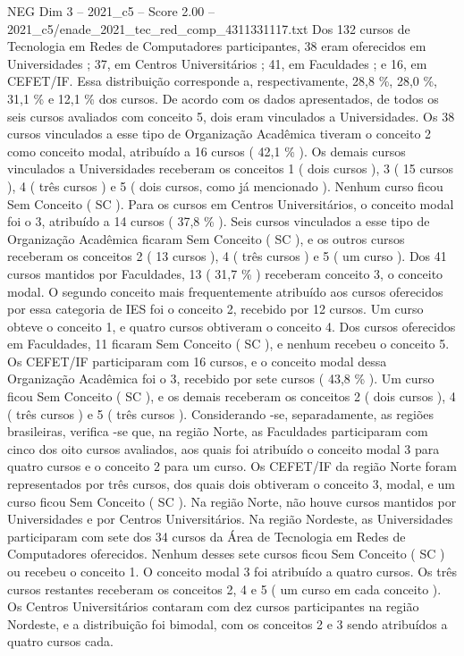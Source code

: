 \begin{textsample}{NEG Dim 3 – 2021\_c5 – Score 2.00 – 2021\_c5/enade\_2021\_tec\_red\_comp\_4311331117.txt}
Dos 132 cursos de Tecnologia em Redes de Computadores participantes, 38 eram oferecidos em Universidades ; 37, em Centros Universitários ; 41, em Faculdades ; e 16, em CEFET/IF.
Essa distribuição corresponde a, respectivamente, 28,8 \%, 28,0 \%, 31,1 \% e 12,1 \% dos cursos.
De acordo com os dados apresentados, de todos os seis cursos avaliados com conceito 5, dois eram vinculados a Universidades.
Os 38 cursos vinculados a esse tipo de Organização Acadêmica tiveram o conceito 2 como conceito modal, atribuído a 16 cursos ( 42,1 \% ).
Os demais cursos vinculados a Universidades receberam os conceitos 1 ( dois cursos ), 3 ( 15 cursos ), 4 ( três cursos ) e 5 ( dois cursos, como já mencionado ).
Nenhum curso ficou Sem Conceito ( SC ).
Para os cursos em Centros Universitários, o conceito modal foi o 3, atribuído a 14 cursos ( 37,8 \% ).
Seis cursos vinculados a esse tipo de Organização Acadêmica ficaram Sem Conceito ( SC ), e os outros cursos receberam os conceitos 2 ( 13 cursos ), 4 ( três cursos ) e 5 ( um curso ).
Dos 41 cursos mantidos por Faculdades, 13 ( 31,7 \% ) receberam conceito 3, o conceito modal.
O segundo conceito mais frequentemente atribuído aos cursos oferecidos por essa categoria de IES foi o conceito 2, recebido por 12 cursos.
Um curso obteve o conceito 1, e quatro cursos obtiveram o conceito 4.
Dos cursos oferecidos em Faculdades, 11 ficaram Sem Conceito ( SC ), e nenhum recebeu o conceito 5.
Os CEFET/IF participaram com 16 cursos, e o conceito modal dessa Organização Acadêmica foi o 3, recebido por sete cursos ( 43,8 \% ).
Um curso ficou Sem Conceito ( SC ), e os demais receberam os conceitos 2 ( dois cursos ), 4 ( três cursos ) e 5 ( três cursos ).
Considerando -se, separadamente, as regiões brasileiras, verifica -se que, na região Norte, as Faculdades participaram com cinco dos oito cursos avaliados, aos quais foi atribuído o conceito modal 3 para quatro cursos e o conceito 2 para um curso.
Os CEFET/IF da região Norte foram representados por três cursos, dos quais dois obtiveram o conceito 3, modal, e um curso ficou Sem Conceito ( SC ).
Na região Norte, não houve cursos mantidos por Universidades e por Centros Universitários.
Na região Nordeste, as Universidades participaram com sete dos 34 cursos da Área de Tecnologia em Redes de Computadores oferecidos.
Nenhum desses sete cursos ficou Sem Conceito ( SC ) ou recebeu o conceito 1.
O conceito modal 3 foi atribuído a quatro cursos.
Os três cursos restantes receberam os conceitos 2, 4 e 5 ( um curso em cada conceito ).
Os Centros Universitários contaram com dez cursos participantes na região Nordeste, e a distribuição foi bimodal, com os conceitos 2 e 3 sendo atribuídos a quatro cursos cada.

\end{textsample}
